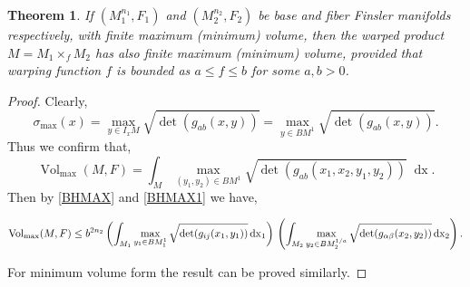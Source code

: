 \documentclass[pdflatex,sn-mathphys-num]{sn-jnl}%
\theoremstyle{thmstyleone}%
\newtheorem{theorem}{Theorem}%
\theoremstyle{thmstyletwo}%
\theoremstyle{thmstylethree}%
\begin{document}
	\begin{theorem}\label{max}
		If $(M_1^{n_1},F_1)$  and $(M_2^{n_2},F_2)$ be base and fiber Finsler manifolds respectively, with finite maximum (minimum)  volume, then the warped product $M=M_1\times_f M_2$ has also  finite maximum (minimum) volume, provided that warping function $f$ is bounded as $a \leq f \leq b$ for some $a, b > 0$.	  
	\end{theorem}
	\begin{proof}
		Clearly,
		\begin{equation}
			\sigma_{\max}(x)= \max\limits_{y \in I_{x} M}\sqrt{\det(g_{ab}(x ,y))}
   = \max\limits_{y \in{BM^1}}\sqrt{\det(g_{ab}(x ,y))}.
		\end{equation}
	Thus we  confirm that,	
		\begin{dmath}
			\operatorname{Vol}_{\max}(M,F)= \int_{M} \max\limits_{(y_1,y_2) \in{BM^1}}\sqrt{\det(g_{ab}(x_1,x_2,y_1,y_2))}\; \operatorname{dx}.
        \end{dmath} 
            Then by \eqref{BHMAX} and \eqref{BHMAX1} we have,    
         
       \begin{dmath}  
\operatorname{Vol}_{\max}(M,F)
             \leq   b^{2n_2} \left( \int_{M_1} \max\limits_{y_1 \in BM_1^1}\sqrt{\det(g_{ij}(x_1,y_1))}\operatorname{dx}_1\right)\\
            \left ( \int_{M_2}\max\limits_{y_{2} \in BM_2^{1/a}}\sqrt{\det(g_{\alpha\beta}(x_2,y_2))} \operatorname{dx}_2 \right).
        \end{dmath}    
         
			
   



  
		For minimum volume form the result can be proved similarly.
	\end{proof}
	
	\vspace{0.2in}
	
	
	
\end{document}
